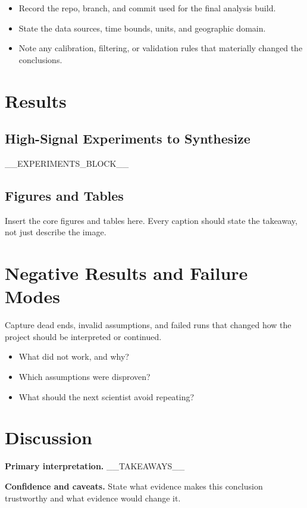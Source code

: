 \documentclass[8pt,twocolumn]{extarticle}
\newcommand{\placeholder}[1]{\textcolor{SondeMuted}{#1}}
\newcommand{\decision}[1]{\textbf{#1}}
\begin{document}
\begin{itemize}
  \item Record the repo, branch, and commit used for the final analysis build.
  \item State the data sources, time bounds, units, and geographic domain.
  \item Note any calibration, filtering, or validation rules that materially changed the conclusions.
\end{itemize}

\section*{Results}

\subsection*{High-Signal Experiments to Synthesize}
__EXPERIMENTS_BLOCK__

\subsection*{Figures and Tables}
\placeholder{Insert the core figures and tables here. Every caption should state the takeaway, not just describe the image.}

\section*{Negative Results and Failure Modes}

\placeholder{Capture dead ends, invalid assumptions, and failed runs that changed how the project should be interpreted or continued.}

\begin{itemize}
  \item \placeholder{What did not work, and why?}
  \item \placeholder{Which assumptions were disproven?}
  \item \placeholder{What should the next scientist avoid repeating?}
\end{itemize}

\section*{Discussion}

\decision{Primary interpretation.} __TAKEAWAYS__

\vspace{0.35em}
\decision{Confidence and caveats.} \placeholder{State what evidence makes this conclusion trustworthy and what evidence would change it.}
\end{document}

